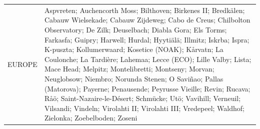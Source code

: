 \documentclass[journal abbreviation, manuscript]{copernicus}
\begin{document}
\begin{table}
\begin{tabularx}{\textwidth}{lX}
  EUROPE   & Aspvreten; Auchencorth Moss; Bilthoven; Birkenes II; Bredkälen; Cabauw Wielsekade; Cabauw Zijdeweg; Cabo de Creus; Chilbolton Observatory; De Zilk; Deuselbach; Diabla Gora; Els Torms; Farkasfa; Guipry; Harwell; Hurdal; Hyytiälä; Illmitz; Iskrba; Ispra; K-puszta; Kollumerwaard; Kosetice (NOAK); Kårvatn; La Coulonche; La Tardière; Lahemaa; Lecce (ECO); Lille Valby; Lista; Mace Head; Melpitz; Montelibretti; Montseny; Morvan; Neuglobsow; Niembro; Norunda Stenen; O Saviñao; Pallas (Matorova); Payerne; Penausende; Peyrusse Vieille; Revin; Rucava; Råö; Saint-Nazaire-le-Désert; Schmücke; Utö; Vavihill; Verneuil; Vilsandi; Vindeln; Virolahti II; Virolahti III; Vredepeel; Waldhof; Zielonka; Zoebelboden; Zoseni                                                                                                                                                                                                                                                                                                                                                                                                                                                                                                                                                                                                                                                                                                                                                                                                                                                                                                                                                                                                                                                                                                                                                                                                                                                                           \\

\end{tabularx}
\end{table}
\end{document}
